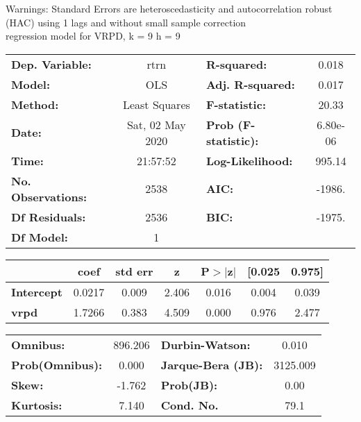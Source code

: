 Warnings: \newline
 [1] Standard Errors are heteroscedasticity and autocorrelation robust (HAC) using 1 lags and without small sample correction\\ 

regression model for VRPD, k = 9 h = 9\begin{center}
\begin{tabular}{lclc}
\toprule
\textbf{Dep. Variable:}    &       rtrn       & \textbf{  R-squared:         } &     0.018   \\
\textbf{Model:}            &       OLS        & \textbf{  Adj. R-squared:    } &     0.017   \\
\textbf{Method:}           &  Least Squares   & \textbf{  F-statistic:       } &     20.33   \\
\textbf{Date:}             & Sat, 02 May 2020 & \textbf{  Prob (F-statistic):} &  6.80e-06   \\
\textbf{Time:}             &     21:57:52     & \textbf{  Log-Likelihood:    } &    995.14   \\
\textbf{No. Observations:} &        2538      & \textbf{  AIC:               } &    -1986.   \\
\textbf{Df Residuals:}     &        2536      & \textbf{  BIC:               } &    -1975.   \\
\textbf{Df Model:}         &           1      & \textbf{                     } &             \\
\bottomrule
\end{tabular}
\begin{tabular}{lcccccc}
                   & \textbf{coef} & \textbf{std err} & \textbf{z} & \textbf{P$> |$z$|$} & \textbf{[0.025} & \textbf{0.975]}  \\
\midrule
\textbf{Intercept} &       0.0217  &        0.009     &     2.406  &         0.016        &        0.004    &        0.039     \\
\textbf{vrpd}      &       1.7266  &        0.383     &     4.509  &         0.000        &        0.976    &        2.477     \\
\bottomrule
\end{tabular}
\begin{tabular}{lclc}
\textbf{Omnibus:}       & 896.206 & \textbf{  Durbin-Watson:     } &    0.010  \\
\textbf{Prob(Omnibus):} &   0.000 & \textbf{  Jarque-Bera (JB):  } & 3125.009  \\
\textbf{Skew:}          &  -1.762 & \textbf{  Prob(JB):          } &     0.00  \\
\textbf{Kurtosis:}      &   7.140 & \textbf{  Cond. No.          } &     79.1  \\
\bottomrule
\end{tabular}
\end{center}

